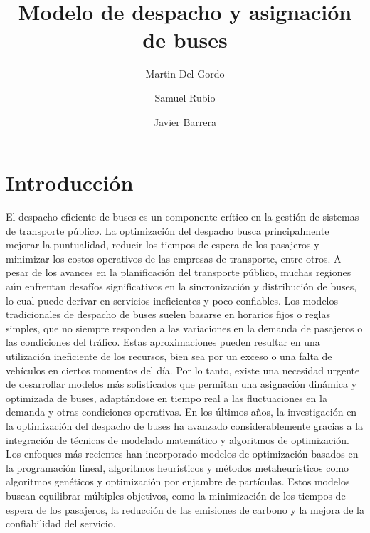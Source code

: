 \documentclass[preprint,11pt]{elsarticle}
\begin{document}
\begin{frontmatter}

\title{Modelo de despacho y asignación de buses}


\author[label1]{Martin Del Gordo}
\address[label1]{Departamento de Ingenier\'ia Industrial, Universidad de Los Andes, Colombia}

\author[label1]{Samuel Rubio}

\author[label1]{Javier Barrera}





\end{frontmatter}

\linenumbers
\section{Introducción}
\vspace{-1mm}
\label{Int}

El despacho eficiente de buses es un componente crítico en la gestión de sistemas de transporte público. La optimización del despacho busca principalmente mejorar la puntualidad, reducir los tiempos de espera de los pasajeros y minimizar los costos operativos de las empresas de transporte, entre otros. A pesar de los avances en la planificación del transporte público, muchas regiones aún enfrentan desafíos significativos en la sincronización y distribución de buses, lo cual puede derivar en servicios ineficientes y poco confiables. Los modelos tradicionales de despacho de buses suelen basarse en horarios fijos o reglas simples, que no siempre responden a las variaciones en la demanda de pasajeros o las condiciones del tráfico. Estas aproximaciones pueden resultar en una utilización ineficiente de los recursos, bien sea por un exceso o una falta de vehículos en ciertos momentos del día. Por lo tanto, existe una necesidad urgente de desarrollar modelos más sofisticados que permitan una asignación dinámica y optimizada de buses, adaptándose en tiempo real a las fluctuaciones en la demanda y otras condiciones operativas. En los últimos años, la investigación en la optimización del despacho de buses ha avanzado considerablemente gracias a la integración de técnicas de modelado matemático y algoritmos de optimización. Los enfoques más recientes han incorporado modelos de optimización basados en la programación lineal, algoritmos heurísticos y métodos metaheurísticos como algoritmos genéticos y optimización por enjambre de partículas. Estos modelos buscan equilibrar múltiples objetivos, como la minimización de los tiempos de espera de los pasajeros, la reducción de las emisiones de carbono y la mejora de la confiabilidad del servicio. 
\end{document}
